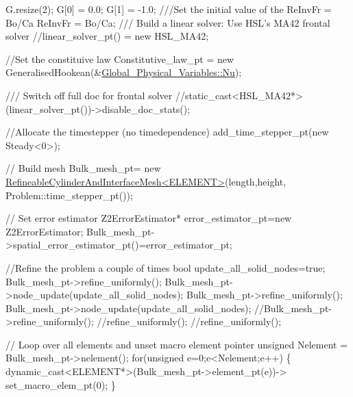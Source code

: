 \begin{DoxyCodeInclude}
 G.resize(2);
 G[0] = 0.0; G[1] = -1.0;
\textcolor{comment}{}
\textcolor{comment}{ ///Set the initial value of the ReInvFr = Bo/Ca}
\textcolor{comment}{} ReInvFr = Bo/Ca;
\textcolor{comment}{}
\textcolor{comment}{ /// Build a linear solver: Use HSL's MA42 frontal solver}
\textcolor{comment}{} \textcolor{comment}{//linear\_solver\_pt() = new HSL\_MA42;}

 \textcolor{comment}{//Set the constituive law}
 Constitutive\_law\_pt = \textcolor{keyword}{new} GeneralisedHookean(&\hyperlink{namespaceGlobal__Physical__Variables_a3962c36313826b19f216f6bbbdd6a477}{Global\_Physical\_Variables::Nu});

 \textcolor{comment}{}
\textcolor{comment}{ /// Switch off full doc for frontal solver}
\textcolor{comment}{} \textcolor{comment}{//static\_cast<HSL\_MA42*>(linear\_solver\_pt())->disable\_doc\_stats();}

 \textcolor{comment}{//Allocate the timestepper (no timedependence)}
 add\_time\_stepper\_pt(\textcolor{keyword}{new} Steady<0>);
   
 \textcolor{comment}{// Build mesh}
 Bulk\_mesh\_pt= 
  \textcolor{keyword}{new} \hyperlink{classRefineableCylinderAndInterfaceMesh}{RefineableCylinderAndInterfaceMesh<ELEMENT>}(length,height,
                                                  Problem::time\_stepper\_pt());
 
 \textcolor{comment}{// Set error estimator}
 Z2ErrorEstimator* error\_estimator\_pt=\textcolor{keyword}{new} Z2ErrorEstimator;
 Bulk\_mesh\_pt->spatial\_error\_estimator\_pt()=error\_estimator\_pt;
  

 \textcolor{comment}{//Refine the problem a couple of times}
 \textcolor{keywordtype}{bool} update\_all\_solid\_nodes=\textcolor{keyword}{true};
 Bulk\_mesh\_pt->refine\_uniformly();
 Bulk\_mesh\_pt->node\_update(update\_all\_solid\_nodes);
 Bulk\_mesh\_pt->refine\_uniformly();
 Bulk\_mesh\_pt->node\_update(update\_all\_solid\_nodes);
 \textcolor{comment}{//Bulk\_mesh\_pt->refine\_uniformly();}
 \textcolor{comment}{//refine\_uniformly();}
 \textcolor{comment}{//refine\_uniformly();}
  
 \textcolor{comment}{// Loop over all elements and unset macro element pointer}
 \textcolor{keywordtype}{unsigned} Nelement = Bulk\_mesh\_pt->nelement();
 \textcolor{keywordflow}{for}(\textcolor{keywordtype}{unsigned} e=0;e<Nelement;e++)
  \{
   \textcolor{keyword}{dynamic\_cast<}ELEMENT*\textcolor{keyword}{>}(Bulk\_mesh\_pt->element\_pt(e))->
    set\_macro\_elem\_pt(0);
  \}



\end{DoxyCodeInclude}
